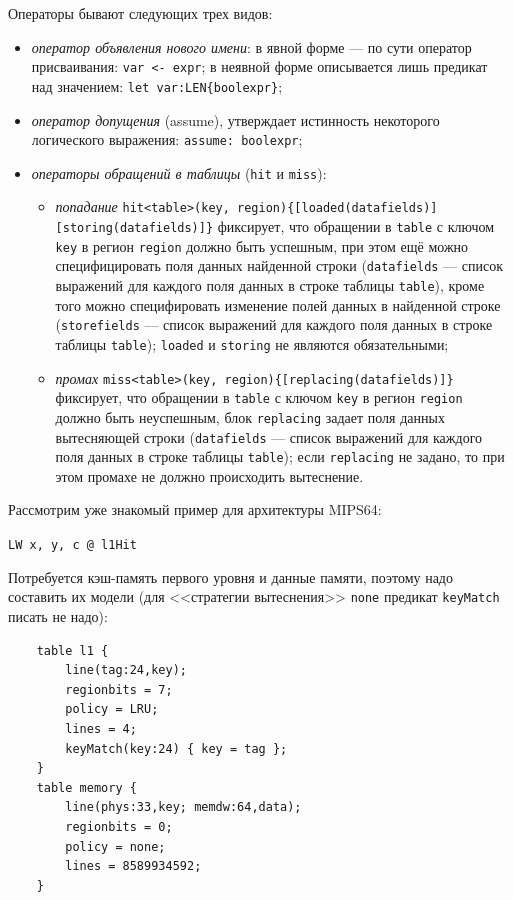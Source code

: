\documentclass[14pt]{extreport}
\begin{document}
Операторы бывают следующих трех видов:
\begin{itemize}
    \item \emph{оператор объявления нового имени}: в явной форме --- по сути оператор присваивания: \texttt{var <- expr}; в неявной форме описывается лишь предикат над значением: \texttt{let var:LEN\{boolexpr\}};
    \item \emph{оператор допущения} (assume), утверждает истинность некоторого логического выражения: \texttt{assume: boolexpr};
    \item \emph{операторы обращений в таблицы} (\texttt{hit} и \texttt{miss}):
        \begin{itemize}
            \item \emph{попадание} \texttt{hit<table>(key, region)\{[loaded(datafields)]}\\\texttt{[storing(datafields)]\}} фиксирует, что обращении в \texttt{table} с ключом \texttt{key} в регион \texttt{region} должно быть успешным, при этом ещё можно специфицировать поля данных найденной строки (\texttt{datafields} --- список выражений для каждого поля данных в строке таблицы \texttt{table}), кроме того можно специфировать изменение полей данных в найденной строке (\texttt{storefields} --- список выражений для каждого поля данных в строке таблицы \texttt{table}); \texttt{loaded} и \texttt{storing} не являются обязательными;
            \item \emph{промах} \texttt{miss<table>(key, region)\{[replacing(datafields)]\}}\\фиксирует, что обращении в \texttt{table} с ключом \texttt{key} в регион \texttt{region} должно быть неуспешным, блок \texttt{replacing} задает поля данных вытесняющей строки (\texttt{datafields} --- список выражений для каждого поля данных в строке таблицы \texttt{table}); если \texttt{replacing} не задано, то при этом промахе не должно происходить вытеснение.
        \end{itemize}
\end{itemize}


Рассмотрим уже знакомый пример для архитектуры MIPS64:

\texttt{LW x, y, c @ l1Hit}

Потребуется кэш-память первого уровня и данные памяти, поэтому надо составить их модели (для <<стратегии вытеснения>> \texttt{none} предикат \texttt{keyMatch} писать не надо):
\begin{verbatim}
    table l1 {
        line(tag:24,key);
        regionbits = 7;
        policy = LRU;
        lines = 4;
        keyMatch(key:24) { key = tag };
    }
    table memory {
        line(phys:33,key; memdw:64,data);
        regionbits = 0;
        policy = none;
        lines = 8589934592;
    }
\end{verbatim}
\end{document}
